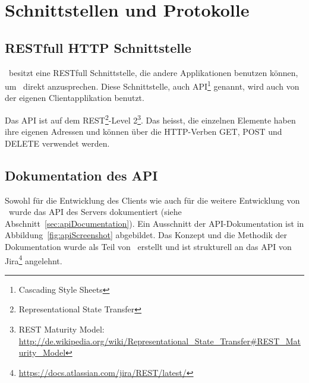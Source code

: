 \chapter{Schnittstellen und Protokolle}
	
\section{RESTfull HTTP Schnittstelle}

	\eeppi\ besitzt eine RESTfull Schnittstelle, die andere Applikationen benutzen können, um \eeppi\ direkt anzusprechen.
	Diese Schnittstelle, auch API\footnote{Cascading Style Sheets} genannt, wird auch von der eigenen Clientapplikation benutzt.

	Das API ist auf dem REST\footnote{Representational State Transfer}-Level 2\footnote{REST Maturity Model: \url{http://de.wikipedia.org/wiki/Representational\_State\_Transfer\#REST\_Maturity\_Model}}.
	Das heisst, die einzelnen Elemente haben ihre eigenen Adressen
	und können über die HTTP-Verben GET, POST und DELETE verwendet werden.
	
\section{Dokumentation des API}
	\label{sec:apiDokumentationCreation}
	Sowohl für die Entwicklung des Clients wie auch für die weitere Entwicklung von \eeppi\ wurde das API des Servers dokumentiert (siehe Abschnitt~\ref{sec:apiDocumentation}).
	Ein Ausschnitt der API-Dokumentation ist in Abbildung~\ref{fig:apiScreenshot} abgebildet.
	Das Konzept und die Methodik der Dokumentation wurde als Teil von \eeppi\ erstellt
	und ist strukturell an das API von Jira\footnote{\url{https://docs.atlassian.com/jira/REST/latest/}} angelehnt.
	
